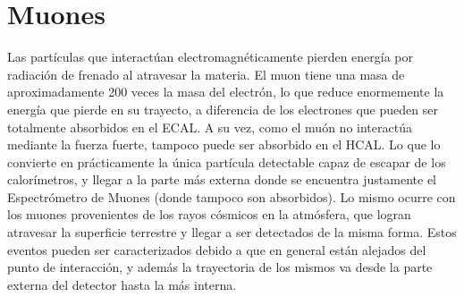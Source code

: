 \begin{table} 
\centering
\caption{Definición de algunos de los WPs de aislamiento para fotones y electrones. En particular los mostrados se definen a partir de cortes fijos en las variables (\textit{fixed cuts}).}

\label{tab:IDWPs}
\end{table}








\section{Muones}


Las partículas que interactúan electromagnéticamente pierden energía por radiación de frenado al atravesar la materia. El muon tiene una masa de aproximadamente 200 veces la masa del electrón, lo que reduce enormemente la energía que pierde en su trayecto, a diferencia de los electrones que pueden ser totalmente absorbidos en el ECAL. A su vez, como el muón no interactúa mediante la fuerza fuerte, tampoco puede ser absorbido en el HCAL. Lo que lo convierte en prácticamente la única partícula detectable capaz de escapar de los calorímetros, y llegar a la parte más externa donde se encuentra justamente el Espectrómetro de Muones (donde tampoco son absorbidos). Lo mismo ocurre con los muones provenientes de los rayos cósmicos en la atmósfera, que logran atravesar la superficie terrestre y llegar a ser detectados de la misma forma. Estos eventos pueden ser caracterizados debido a que en general están alejados del punto de interacción, y además la trayectoria de los mismos va desde la parte externa del detector hasta la más interna.


